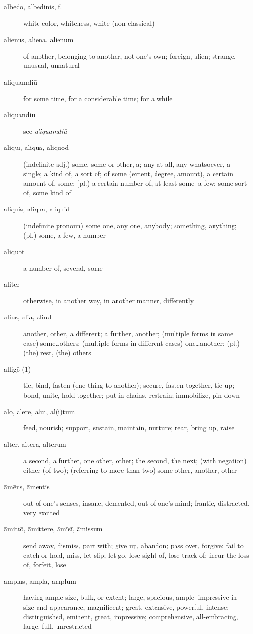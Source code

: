 \begin{description}
    \item[albēdō, albēdinis, f.] white color, whiteness, white (non-classical)
    \item[aliēnus, aliēna, aliēnum] of another, belonging to another, not one's own; foreign, alien; strange, unusual, unnatural
    \item[aliquamdiū] for some time, for a considerable time; for a while
    \item[aliquandiū] see \textit{aliquamdiū}
    \item[aliquī, aliqua, aliquod] (indefinite adj.) some, some or other, a; any at all, any whatsoever, a single; a kind of, a sort of; of some (extent, degree, amount), a certain amount of, some; (pl.) a certain number of, at least some, a few; some sort of, some kind of
    \item[aliquis, aliqua, aliquid] (indefinite pronoun) some one, any one, anybody; something, anything; (pl.) some, a few, a number
    \item[aliquot] a number of, several, some
    \item[aliter] otherwise, in another way, in another manner, differently
    \item[alius, alia, aliud] another, other, a different; a further, another; (multiple forms in same case) some\dots others; (multiple forms in different cases) one\dots another; (pl.) (the) rest, (the) others
    \item[alligō (1)] tie, bind, fasten (one thing to another); secure, fasten together, tie up; bond, unite, hold together; put in chains, restrain; immobilize, pin down
    \item[alō, alere, aluī, al(i)tum] feed, nourish; support, sustain, maintain, nurture; rear, bring up, raise
    \item[alter, altera, alterum] a second, a further, one other, other; the second, the next; (with negation) either (of two); (referring to more than two) some other, another, other
    \item[āmēns, āmentis] out of one's senses, insane, demented, out of one's mind; frantic, distracted, very excited
    \item[āmittō, āmittere, āmīsī, āmissum] send away, dismiss, part with; give up, abandon; pass over, forgive; fail to catch or hold, miss, let slip; let go, lose sight of, lose track of; incur the loss of, forfeit, lose
    \item[amplus, ampla, amplum] having ample size, bulk, or extent; large, spacious, ample; impressive in size and appearance, magnificent; great, extensive, powerful, intense; distinguished, eminent, great, impressive; comprehensive, all-embracing, large, full, unrestricted

\end{description}
